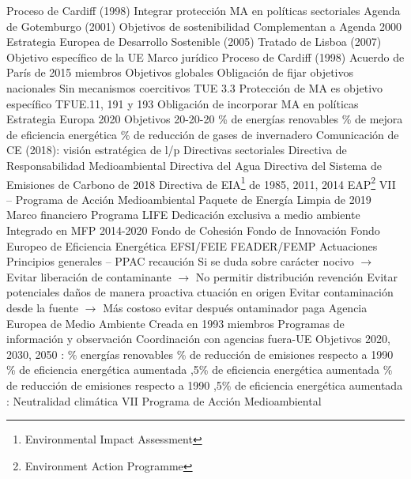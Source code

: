 \documentclass{nuevotema}
\begin{document}
\begin{esquemal}
			\3 Proceso de Cardiff (1998)
				\4[] Integrar protección MA en políticas sectoriales
			\3 Agenda de Gotemburgo (2001)
				\4 Objetivos de sostenibilidad
				\4[] Complementan a Agenda 2000
				\4 Estrategia Europea de Desarrollo Sostenible (2005)
			\3 Tratado de Lisboa (2007)
				\4 Objetivo específico de la UE
		\2 Marco jurídico
			\3 Proceso de Cardiff (1998)
			\3 Acuerdo de París de 2015
				 miembros
				\4 Objetivos globales
				\4 Obligación de fijar objetivos nacionales
				\4 Sin mecanismos coercitivos
			\3 TUE 3.3
				\4 Protección de MA es objetivo específico
			\3 TFUE.11, 191 y 193
				\4 Obligación de incorporar MA en políticas
			\3 Estrategia Europa 2020
				\4 Objetivos 20-20-20
				\% de energías renovables
				\% de mejora de eficiencia energética
				\% de reducción de gases de invernadero
			\3 Comunicación de CE (2018): visión estratégica de l/p
			\3 Directivas sectoriales
				\4 Directiva de Responsabilidad Medioambiental
				\4 Directiva del Agua
				\4 Directiva del Sistema de Emisiones de Carbono de 2018
				\4 Directiva de EIA\footnote{Environmental Impact Assessment} de 1985, 2011, 2014
			\3 EAP\footnote{Environment Action Programme} VII -- Programa de Acción Medioambiental
			\3 Paquete de Energía Limpia de 2019
		\2 Marco financiero
			\3 Programa LIFE
				\4 Dedicación exclusiva a medio ambiente
				\4 Integrado en MFP 2014-2020
			\3 Fondo de Cohesión
			\3 Fondo de Innovación
			\3 Fondo Europeo de Eficiencia Energética
			\3 EFSI/FEIE
			\3 FEADER/FEMP
		\2 Actuaciones
			\3 Principios generales -- PPAC
				\4 recaución
				\4[] Si se duda sobre carácter nocivo
				\4[] $\to$ Evitar liberación de contaminante
				\4[] $\to$ No permitir distribución
				\4 revención
				\4[] Evitar potenciales daños de manera proactiva
				\4 ctuación en origen
				\4[] Evitar contaminación desde la fuente
				\4[] $\to$ Más costoso evitar después
				\4 ontaminador paga
			\3 Agencia Europea de Medio Ambiente
				\4 Creada en 1993
				\4 33 miembros
				\4 Programas de información y observación
				\4 Coordinación con agencias fuera-UE
			\3 Objetivos 2020, 2030, 2050
				:
				\% energías renovables
				\% de reducción de emisiones respecto a 1990
				\% de eficiencia energética aumentada
				,5\% de eficiencia energética aumentada
				\% de reducción de emisiones respecto a 1990
				,5\% de eficiencia energética aumentada
				:
				\4[] Neutralidad climática
			\3 VII Programa de Acción Medioambiental

\end{esquemal}
\end{document}
